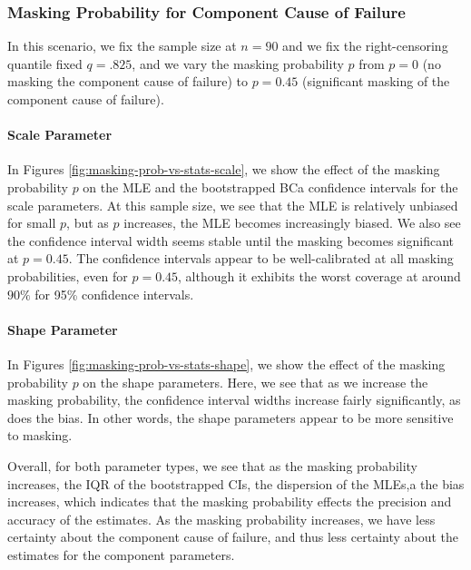\documentclass[
]{article}
\begin{document}
\hypertarget{sec:p-vs-mttf}{%
\subsubsection{Masking Probability for Component Cause of
Failure}\label{sec:p-vs-mttf}}

In this scenario, we fix the sample size at \(n = 90\) and we fix the
right-censoring quantile fixed \(q = .825\), and we vary the masking
probability \(p\) from \(p = 0\) (no masking the component cause of
failure) to \(p = 0.45\) (significant masking of the component cause of
failure).

\hypertarget{scale-parameter}{%
\paragraph*{Scale Parameter}\label{scale-parameter}}

In Figures \ref{fig:masking-prob-vs-stats-scale}, we show the effect of
the masking probability \(p\) on the MLE and the bootstrapped BCa
confidence intervals for the scale parameters. At this sample size, we
see that the MLE is relatively unbiased for small \(p\), but as \(p\)
increases, the MLE becomes increasingly biased. We also see the
confidence interval width seems stable until the masking becomes
significant at \(p = 0.45\). The confidence intervals appear to be
well-calibrated at all masking probabilities, even for \(p = 0.45\),
although it exhibits the worst coverage at around \(90\%\) for 95\%
confidence intervals.

\hypertarget{shape-parameter}{%
\paragraph*{Shape Parameter}\label{shape-parameter}}

In Figures \ref{fig:masking-prob-vs-stats-shape}, we show the effect of
the masking probability \(p\) on the shape parameters. Here, we see that
as we increase the masking probability, the confidence interval widths
increase fairly significantly, as does the bias. In other words, the
shape parameters appear to be more sensitive to masking.

Overall, for both parameter types, we see that as the masking
probability increases, the IQR of the bootstrapped CIs, the dispersion
of the MLEs,a the bias increases, which indicates that the masking
probability effects the precision and accuracy of the estimates. As the
masking probability increases, we have less certainty about the
component cause of failure, and thus less certainty about the estimates
for the component parameters.
\end{document}
